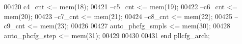 \begin{DoxyCode}
00420 \textcolor{vhdlchar}{c4_cnt}         \textcolor{vhdlchar}{<=} \textcolor{vhdlchar}{mem}\textcolor{vhdlchar}{(}\textcolor{vhdllogic}{}\textcolor{vhdllogic}{18}\textcolor{vhdlchar}{)};
00421 \textcolor{keyword}{--c5\_cnt       <= mem(19);}
00422 \textcolor{keyword}{--c6\_cnt       <= mem(20);}
00423 \textcolor{keyword}{--c7\_cnt       <= mem(21);}
00424 \textcolor{keyword}{--c8\_cnt       <= mem(22);}
00425 \textcolor{keyword}{--c9\_cnt       <= mem(23);}
00426 
00427 \textcolor{vhdlchar}{auto_phcfg_smpls} \textcolor{vhdlchar}{<=} \textcolor{vhdlchar}{mem}\textcolor{vhdlchar}{(}\textcolor{vhdllogic}{}\textcolor{vhdllogic}{30}\textcolor{vhdlchar}{)};
00428 \textcolor{vhdlchar}{auto_phcfg_step}  \textcolor{vhdlchar}{<=} \textcolor{vhdlchar}{mem}\textcolor{vhdlchar}{(}\textcolor{vhdllogic}{}\textcolor{vhdllogic}{31}\textcolor{vhdlchar}{)};
00429 
00430 
00431 \textcolor{keywordflow}{end} \textcolor{vhdlchar}{pllcfg\_arch};
\end{DoxyCode}
